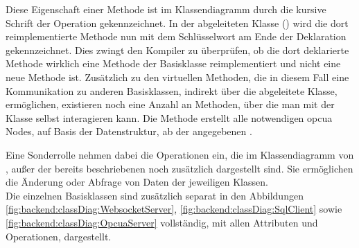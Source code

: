 Diese Eigenschaft einer Methode ist im Klassendiagramm durch die kursive Schrift der Operation gekennzeichnet.
In der abgeleiteten Klasse () wird die dort reimplementierte Methode nun mit dem Schlüsselwort  am Ende der Deklaration gekennzeichnet.
Dies zwingt den Kompiler zu überprüfen, ob die dort deklarierte Methode wirklich eine Methode der Basisklasse reimplementiert und nicht eine neue Methode ist.
Zusätzlich zu den virtuellen Methoden, die in diesem Fall eine Kommunikation zu anderen Basisklassen, indirekt über die abgeleitete Klasse, ermöglichen, existieren noch eine Anzahl an Methoden, 
über die man mit der Klasse selbst interagieren kann.
Die Methode  erstellt alle notwendigen \ac{opcua} Nodes, auf Basis der Datenstruktur, ab der angegebenen .

Eine Sonderrolle nehmen dabei die Operationen ein, die im Klassendiagramm von , außer der bereits beschriebenen noch zusätzlich dargestellt sind.
Sie ermöglichen die Änderung oder Abfrage von Daten der jeweiligen Klassen.\\
Die einzelnen Basisklassen sind zusätzlich separat in den Abbildungen 
\ref{fig:backend:classDiag:WebsocketServer}, \ref{fig:backend:classDiag:SqlClient} sowie \ref{fig:backend:classDiag:OpcuaServer} 
vollständig, mit allen Attributen und Operationen, dargestellt.


